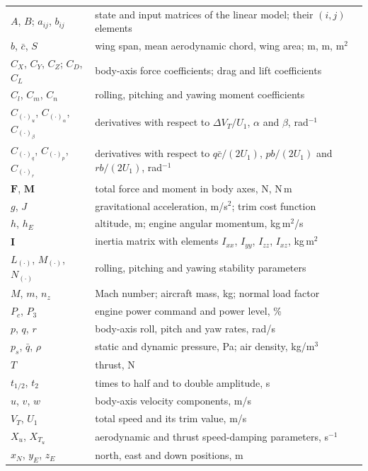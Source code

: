 \documentclass[conf]{new-aiaa}
\begin{document}
{\renewcommand\arraystretch{1.0}
\noindent\begin{longtable*}{@{}l @{\quad=\quad} l@{}}
$A$, $B$; $a_{ij}$, $b_{ij}$ & state and input matrices of the linear model; their $(i,j)$ elements \\
$b$, $\bar c$, $S$ & wing span, mean aerodynamic chord, wing area; m, m, m$^2$ \\
$C_X$, $C_Y$, $C_Z$; $C_D$, $C_L$ & body-axis force coefficients; drag and lift coefficients \\
$C_l$, $C_m$, $C_n$ & rolling, pitching and yawing moment coefficients \\
$C_{(\cdot)_u}$, $C_{(\cdot)_\alpha}$, $C_{(\cdot)_\beta}$ & derivatives with respect to $\Delta V_T/U_1$, $\alpha$ and $\beta$, rad$^{-1}$ \\
$C_{(\cdot)_q}$, $C_{(\cdot)_p}$, $C_{(\cdot)_r}$ & derivatives with respect to $q\bar c/(2U_1)$, $pb/(2U_1)$ and $rb/(2U_1)$, rad$^{-1}$ \\
$\mathbf F$, $\mathbf M$ & total force and moment in body axes, N, N\,m \\
$g$, $J$ & gravitational acceleration, m/s$^2$; trim cost function \\
$h$, $h_E$ & altitude, m; engine angular momentum, kg\,m$^2$/s \\
$\mathbf I$ & inertia matrix with elements $I_{xx}$, $I_{yy}$, $I_{zz}$, $I_{xz}$, kg\,m$^2$ \\
$L_{(\cdot)}$, $M_{(\cdot)}$, $N_{(\cdot)}$ & rolling, pitching and yawing stability parameters \\
$M$, $m$, $n_z$ & Mach number; aircraft mass, kg; normal load factor \\
$P_c$, $P_3$ & engine power command and power level, \% \\
$p$, $q$, $r$ & body-axis roll, pitch and yaw rates, rad/s \\
$p_s$, $\bar q$, $\rho$ & static and dynamic pressure, Pa; air density, kg/m$^3$ \\
$T$ & thrust, N \\
$t_{1/2}$, $t_2$ & times to half and to double amplitude, s \\
$u$, $v$, $w$ & body-axis velocity components, m/s \\
$V_T$, $U_1$ & total speed and its trim value, m/s \\
$X_u$, $X_{T_u}$ & aerodynamic and thrust speed-damping parameters, s$^{-1}$ \\
$x_N$, $y_E$, $z_E$ & north, east and down positions, m \\

\end{longtable*}}
\end{document}
